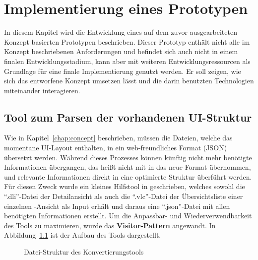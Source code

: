 \chapter{Implementierung eines Prototypen}\label{chap:implementation}
In diesem Kapitel wird die Entwicklung eines auf dem zuvor ausgearbeiteten Konzept basierten Prototypen beschrieben. Dieser Prototyp enthält nicht alle im Konzept beschriebenen Anforderungen und befindet sich auch nicht in einem finalen Entwicklungsstadium, kann aber mit weiteren Entwicklungsressourcen als Grundlage für eine finale Implementierung genutzt werden. Er soll zeigen, wie sich das entworfene Konzept umsetzen lässt und die darin benutzten Technologien miteinander interagieren.

\section{Tool zum Parsen der vorhandenen UI-Struktur}
Wie in Kapitel~\ref{chap:concept} beschrieben, müssen die Dateien, welche das momentane UI-Layout enthalten, in ein web-freundliches Format (JSON) übersetzt werden. Während dieses Prozesses können künftig nicht mehr benötigte Informationen übergangen, das heißt nicht mit in das neue Format übernommen, und relevante Informationen direkt in eine optimierte Struktur überführt werden. Für diesen Zweck wurde ein kleines Hilfstool in  geschrieben, welches sowohl die \enquote{.dli}-Datei der Detailansicht als auch die \enquote{.vlc}-Datei der Übersichtsliste einer einzelnen -Ansicht als Input erhält und daraus eine \enquote{.json}-Datei mit allen benötigten Informationen erstellt. Um die Anpassbar- und Wiederverwendbarkeit des Tools zu maximieren, wurde das \textbf{Visitor-Pattern} angewandt. In Abbildung~\ref{fig:web-conv_file-tree} ist der Aufbau des Tools dargestellt.

\begin{figure}
    \centering
    \captionsetup{justification=centering}
        \caption{Datei-Struktur des Konvertierungstools}\label{fig:web-conv_file-tree}
\end{figure}

